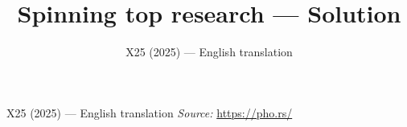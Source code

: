 \documentclass[11pt,a4paper]{article}
\title{\textbf{Spinning top research --- Solution}}
\author{\normalsize X25 (2025) — English translation}
\date{}
\begin{document}
\maketitle
X25 (2025) — English translation
\vspace{1em}
\noindent\textit{Source:} \url{https://pho.rs/}
\end{document}
